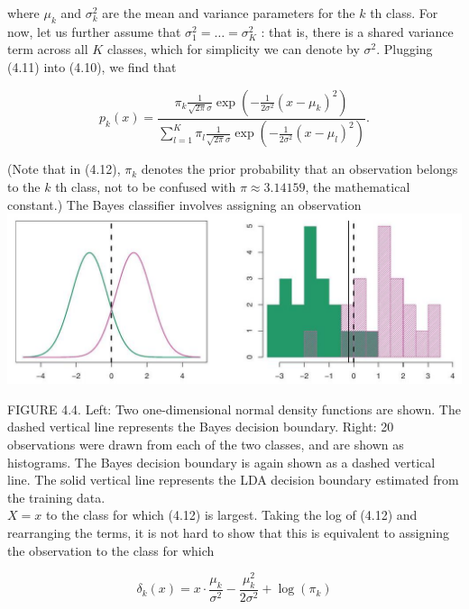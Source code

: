 \documentclass[10pt]{article}
\begin{document}
where $\mu_{k}$ and $\sigma_{k}^{2}$ are the mean and variance parameters for the $k$ th class. For now, let us further assume that $\sigma_{1}^{2}=\ldots=\sigma_{K}^{2}$ : that is, there is a shared variance term across all $K$ classes, which for simplicity we can denote by $\sigma^{2}$. Plugging (4.11) into (4.10), we find that


\begin{equation*}
p_{k}(x)=\frac{\pi_{k} \frac{1}{\sqrt{2 \pi} \sigma} \exp \left(-\frac{1}{2 \sigma^{2}}\left(x-\mu_{k}\right)^{2}\right)}{\sum_{l=1}^{K} \pi_{l} \frac{1}{\sqrt{2 \pi} \sigma} \exp \left(-\frac{1}{2 \sigma^{2}}\left(x-\mu_{l}\right)^{2}\right)} . \tag{4.12}
\end{equation*}


(Note that in (4.12), $\pi_{k}$ denotes the prior probability that an observation belongs to the $k$ th class, not to be confused with $\pi \approx 3.14159$, the mathematical constant.) The Bayes classifier involves assigning an observation\\
\includegraphics[max width=\textwidth, center]{2025_05_05_efe77898333945044de4g-155}

FIGURE 4.4. Left: Two one-dimensional normal density functions are shown. The dashed vertical line represents the Bayes decision boundary. Right: 20 observations were drawn from each of the two classes, and are shown as histograms. The Bayes decision boundary is again shown as a dashed vertical line. The solid vertical line represents the LDA decision boundary estimated from the training data.\\
$X=x$ to the class for which (4.12) is largest. Taking the log of (4.12) and rearranging the terms, it is not hard to show that this is equivalent to assigning the observation to the class for which


\begin{equation*}
\delta_{k}(x)=x \cdot \frac{\mu_{k}}{\sigma^{2}}-\frac{\mu_{k}^{2}}{2 \sigma^{2}}+\log \left(\pi_{k}\right) \tag{4.13}
\end{equation*}
\end{document}
